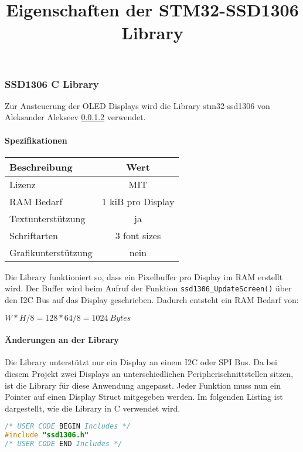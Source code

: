 \subsubsection{SSD1306 C Library}
\label{sec:Library_ssd1306}

Zur Ansteuerung der OLED Displays wird die Library stm32-ssd1306 von Aleksander Alekseev \ref{} verwendet.

\paragraph{Spezifikationen}

\begin{table}[H]
\title{Eigenschaften der STM32-SSD1306 Library}
\centering
\begin{tabular}{|l|c|}
\hline
\textbf{Beschreibung} & \textbf{Wert}     \\ \hline
Lizenz                & MIT               \\ \hline
RAM Bedarf            & 1 kiB pro Display \\ \hline
Textunterstützung     & ja                \\ \hline
Schriftarten          & 3 font sizes      \\ \hline
Grafikunterstützung   & nein              \\ \hline
\end{tabular}
\end{table}

Die Library funktioniert so, dass ein Pixelbuffer pro Display im RAM erstellt wird.
Der Buffer wird beim Aufruf der Funktion \texttt{ssd1306\_UpdateScreen()} über den I2C Bus auf das Display geschrieben.
Dadurch entsteht ein RAM Bedarf von:

${W * H / 8 = 128 * 64 / 8 = 1024\ \si{Bytes}}$

\paragraph{Änderungen an der Library}

Die Library unterstützt nur ein Display an einem I2C oder SPI Bus. Da bei diesem Projekt zwei Displays an unterschiedlichen Peripherischnittstellen sitzen, ist die Library für diese Anwendung angepasst.
Jeder Funktion muss nun ein Pointer auf einen Display Struct mitgegeben werden.
Im folgenden Listing ist dargestellt, wie die Library in C verwendet wird.

\begin{lstlisting}[language=c]
/* USER CODE BEGIN Includes */
#include "ssd1306.h"
/* USER CODE END Includes */
\end{lstlisting}

